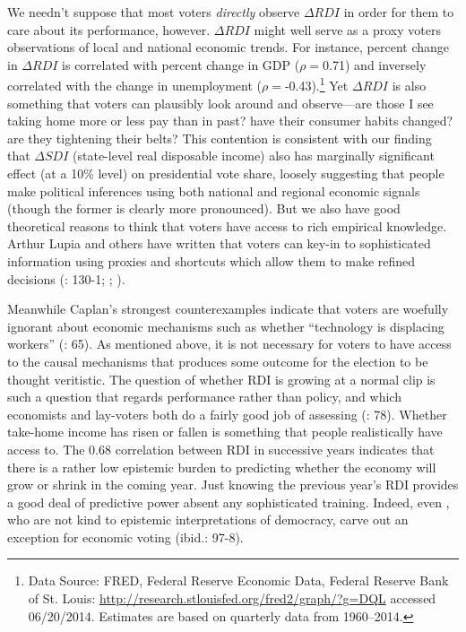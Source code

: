 \documentclass[11pt]{article}
\begin{document}
We needn't suppose that most voters \emph{directly} observe $\Delta
RDI$ in order for them to care about its performance, however. $\Delta RDI$ might well serve as
a proxy voters observations of local and national economic
trends. For instance, percent change in $\Delta
RDI$ is correlated with percent change in GDP
($\rho=$0.71) and inversely correlated with the change in  unemployment
($\rho=$-0.43).\footnote{Data Source: FRED, Federal Reserve Economic
  Data, Federal Reserve Bank of St. Louis:
  \url{http://research.stlouisfed.org/fred2/graph/?g=DQL} accessed
  06/20/2014. Estimates are based on quarterly data from 1960--2014.}
 Yet $\Delta RDI$ is also something that voters can plausibly look around and
observe---are those I see taking home more or less pay than in past?
have their consumer habits changed? are they tightening their belts? This contention is consistent with our finding that $\Delta SDI$ (state-level real disposable income) also has marginally significant effect (at a 10\% level) on presidential vote share, loosely suggesting that people make political inferences using both national and regional economic signals (though the former is clearly more pronounced). 
But we also have good theoretical reasons to think that voters 
have access to rich empirical knowledge. Arthur Lupia and others have written
that voters can key-in to sophisticated information using proxies
and shortcuts which allow them to make refined decisions (\citet{Kinder1981}: 130-1; \citet{Lupia2000};
\citet{Lupia2006}).

Meanwhile Caplan's strongest counterexamples  indicate that voters are woefully ignorant about economic mechanisms such as whether ``technology is displacing workers'' (\cite{Caplan2006}: 65). As mentioned above, it is not necessary for voters to have access to the causal mechanisms that produces some outcome for the election to be thought veritistic. The question of whether RDI is growing at a normal clip is such a question that regards performance rather than policy, and which economists and lay-voters both do a fairly good job of assessing (\cite{Caplan2006}: 78). Whether take-home income has risen or fallen is something that people realistically have access to. The 0.68 correlation between RDI in successive years indicates that there is a rather low epistemic burden to predicting whether the economy will grow or shrink in the coming year. Just knowing the previous year's RDI provides a good deal of predictive power absent any sophisticated training. Indeed, even \cite{achen2016democracy}, who are not kind to epistemic interpretations of democracy, carve out an exception for economic voting (ibid.: 97-8).
\end{document}
